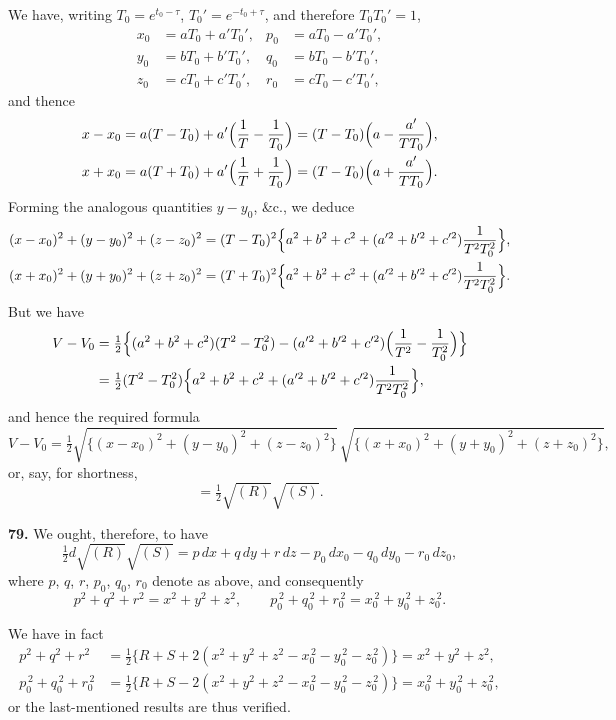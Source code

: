 \documentclass[11pt,a4paper]{article}
\theoremstyle{plain}
\theoremstyle{definition}
\begin{document}
We have, writing $T_0 = e^{t_0 - \tau}$, $T_0' = e^{-t_0 + \tau}$, and therefore $T_0 T_0' = 1$,
\begin{align*}
x_0 &= aT_0 + a' T_0', & p_0 &= aT_0 - a' T_0', \\
y_0 &= bT_0 + b' T_0', & q_0 &= bT_0 - b' T_0', \\
z_0 &= cT_0 + c' T_0', & r_0 &= cT_0 - c' T_0',
\end{align*}
and thence
\begin{align*}
x - x_0 &= a(T - T_0) + a'\Bigl(\frac{1}{T} - \frac{1}{T_0}\Bigr) = (T - T_0)\Bigl(a - \frac{a'}{TT_0}\Bigr), \\
x + x_0 &= a(T + T_0) + a'\Bigl(\frac{1}{T} + \frac{1}{T_0}\Bigr) = (T - T_0)\Bigl(a + \frac{a'}{TT_0}\Bigr).
\end{align*}
Forming the analogous quantities $y - y_0$, \&c., we deduce
\begin{align*}
(x - x_0)^2 + (y - y_0)^2 + (z - z_0)^2 &= (T - T_0)^2 \Bigl\{a^2 + b^2 + c^2 + (a'^2 + b'^2 + c'^2)\frac{1}{T^2 T_0^2}\Bigr\}, \\
(x + x_0)^2 + (y + y_0)^2 + (z + z_0)^2 &= (T + T_0)^2 \Bigl\{a^2 + b^2 + c^2 + (a'^2 + b'^2 + c'^2)\frac{1}{T^2 T_0^2}\Bigr\}.
\end{align*}
But we have
\begin{align*}
V - V_0 &= \tfrac{1}{2}\Bigl\{(a^2 + b^2 + c^2)(T^2 - T_0^2) - (a'^2 + b'^2 + c'^2)\Bigl(\frac{1}{T^2} - \frac{1}{T_0^2}\Bigr)\Bigr\} \\
&= \tfrac{1}{2}(T^2 - T_0^2)\Bigl\{a^2 + b^2 + c^2 + (a'^2 + b'^2 + c'^2)\frac{1}{T^2 T_0^2}\Bigr\},
\end{align*}
and hence the required formula
\[
V - V_0 = \tfrac{1}{2}\sqrt{\{(x - x_0)^2 + (y - y_0)^2 + (z - z_0)^2\}}\,\sqrt{\{(x + x_0)^2 + (y + y_0)^2 + (z + z_0)^2\}},
\]
or, say, for shortness,
\[
= \tfrac{1}{2}\sqrt{(R)}\sqrt{(S)}.
\]

\smallskip

\noindent\textbf{79.} We ought, therefore, to have
\[
\tfrac{1}{2}d\sqrt{(R)}\sqrt{(S)} = p\,dx + q\,dy + r\,dz - p_0\,dx_0 - q_0\,dy_0 - r_0\,dz_0,
\]
where $p$, $q$, $r$, $p_0$, $q_0$, $r_0$ denote as above, and consequently
\[
p^2 + q^2 + r^2 = x^2 + y^2 + z^2, \qquad p_0^{\,2} + q_0^{\,2} + r_0^{\,2} = x_0^{\,2} + y_0^{\,2} + z_0^{\,2}.
\]

We have in fact
\begin{align*}
p^2 + q^2 + r^2 &= \tfrac{1}{2}\{R + S + 2(x^2 + y^2 + z^2 - x_0^{\,2} - y_0^{\,2} - z_0^{\,2})\} = x^2 + y^2 + z^2, \\
p_0^{\,2} + q_0^{\,2} + r_0^{\,2} &= \tfrac{1}{2}\{R + S - 2(x^2 + y^2 + z^2 - x_0^{\,2} - y_0^{\,2} - z_0^{\,2})\} = x_0^{\,2} + y_0^{\,2} + z_0^{\,2},
\end{align*}
or the last-mentioned results are thus verified.
\end{document}

